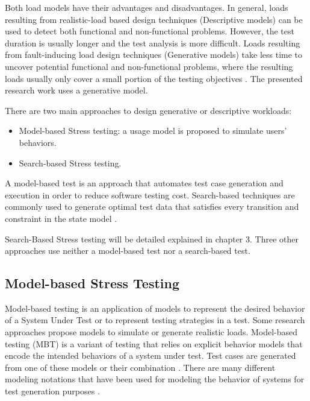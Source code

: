 \documentclass[espaco=umemeio,chapter=TITLE,twoside,openright]{abnt}
\begin{document}
Both load models have their advantages and disadvantages. In general, loads resulting from realistic-load based design techniques (Descriptive models) can be used to detect both functional and non-functional problems. However, the test duration is usually longer and the test analysis is more difficult. Loads resulting from fault-inducing load design techniques (Generative models) take less time to uncover potential functional and non-functional problems, where the resulting loads usually only cover a small portion of the testing objectives \cite{Jiang2010}. The presented research work uses a generative model.


There are two main approaches to design generative or descriptive workloads:

\begin{itemize}
\item Model-based Stress testing: a usage model is proposed to simulate users’ behaviors.
\item Search-based Stress testing.
\end{itemize}


A model-based test is an approach that automates test case generation and execution in order to reduce software testing cost. Search-based techniques are commonly used to generate optimal test data that satisfies every transition and constraint in the state model \cite{Saeed2017}. 

Search-Based Stress testing will be detailed explained in chapter 3. Three other approaches use neither a model-based test nor a search-based test.

\subsection{Model-based Stress Testing}

Model-based testing is an application of models to represent the desired behavior of a System Under Test or to represent testing strategies in a test. Some research approaches propose models to simulate or generate realistic loads. Model-based testing (MBT) is a variant of testing that relies on explicit behavior models that encode the intended behaviors of a system under test. Test cases are generated from one of these models or their combination \cite{MarkUtting2012} \cite{Bertolino2008}. There are many different modeling notations that have been used for modeling the behavior of systems for test generation purposes \cite{MarkUtting2012} \cite{Hierons2009}.
\end{document}
